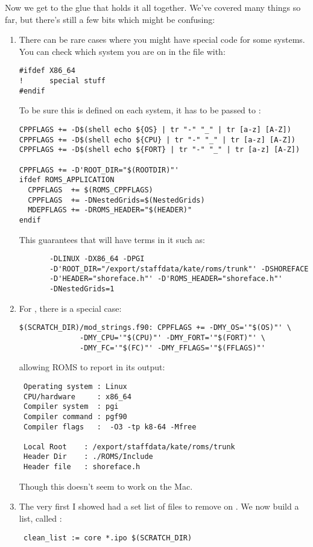 Now we get to the glue that holds it all together. We've covered
many things so far, but there's still a few bits which might be
confusing:
\begin{enumerate}
\item There can be rare cases where you might have special code for
some systems. You can check which system you are on in the 
file with:
\begin{verbatim}
#ifdef X86_64
!      special stuff
#endif
\end{verbatim}
To be sure this is defined on each  system, it has to
be passed to :
\begin{verbatim}
CPPFLAGS += -D$(shell echo ${OS} | tr "-" "_" | tr [a-z] [A-Z])
CPPFLAGS += -D$(shell echo ${CPU} | tr "-" "_" | tr [a-z] [A-Z])
CPPFLAGS += -D$(shell echo ${FORT} | tr "-" "_" | tr [a-z] [A-Z])

CPPFLAGS += -D'ROOT_DIR="$(ROOTDIR)"'
ifdef ROMS_APPLICATION
  CPPFLAGS  += $(ROMS_CPPFLAGS)
  CPPFLAGS  += -DNestedGrids=$(NestedGrids)
  MDEPFLAGS += -DROMS_HEADER="$(HEADER)"
endif
\end{verbatim}
This guarantees that  will have terms in it such
as:
\begin{verbatim}
       -DLINUX -DX86_64 -DPGI
       -D'ROOT_DIR="/export/staffdata/kate/roms/trunk"' -DSHOREFACE
       -D'HEADER="shoreface.h"' -D'ROMS_HEADER="shoreface.h"'
       -DNestedGrids=1
\end{verbatim}

\item For , there is a special case:
\begin{verbatim}
$(SCRATCH_DIR)/mod_strings.f90: CPPFLAGS += -DMY_OS='"$(OS)"' \
              -DMY_CPU='"$(CPU)"' -DMY_FORT='"$(FORT)"' \
              -DMY_FC='"$(FC)"' -DMY_FFLAGS='"$(FFLAGS)"'
\end{verbatim}
allowing ROMS to report in its output:
\begin{verbatim}
 Operating system : Linux
 CPU/hardware     : x86_64
 Compiler system  : pgi
 Compiler command : pgf90
 Compiler flags   :  -O3 -tp k8-64 -Mfree

 Local Root    : /export/staffdata/kate/roms/trunk
 Header Dir    : ./ROMS/Include
 Header file   : shoreface.h
\end{verbatim}
Though this doesn't seem to work on the Mac.

\item The very first  I showed had a set list of
files to remove on . We now build a list,
called \code{clean\_list}:
\begin{verbatim}
 clean_list := core *.ipo $(SCRATCH_DIR)


\end{verbatim}
\end{enumerate}
